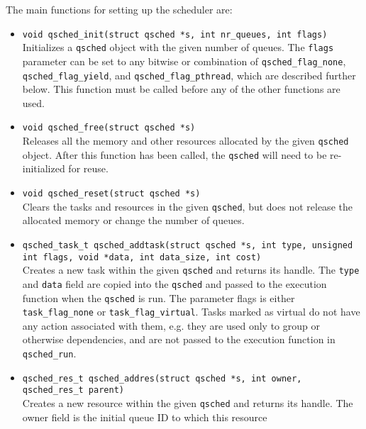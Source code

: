 \documentclass[preprint]{elsarticle}
\begin{document}
The main functions for setting up the scheduler are:
\begin{itemize}
    \item {\tt void qsched\_init(struct qsched *s, int nr\_queues, int flags)} \\
        Initializes a {\tt qsched} object with the given number of queues.
        The {\tt flags} parameter can be set to any bitwise or combination
        of {\tt qsched\_flag\_none},
        {\tt qsched\_flag\_yield}, and {\tt qsched\_flag\_pthread},
        which are described further below.
        This function must be called before any of the other
        functions are used.
        \vspace{1mm}
    \item {\tt void qsched\_free(struct qsched *s)} \\
        Releases all the memory and other resources allocated by the
        given {\tt qsched} object.
        After this function has been called, the {\tt qsched} will
        need to be re-initialized for reuse.
        \vspace{1mm}
    \item {\tt void qsched\_reset(struct qsched *s)} \\
        Clears the tasks and resources in the given {\tt qsched},
        but does not release the allocated memory or change
        the number of queues.
        \vspace{1mm}
    \item {\tt qsched\_task\_t qsched\_addtask(struct qsched *s, int type, unsigned int flags, void *data, int data\_size, int cost)} \\
        Creates a new task within the given {\tt qsched} and returns
        its handle.
        The {\tt type} and {\tt data} field are copied into the {\tt qsched}
        and passed to the execution function when the {\tt qsched} is run.
        The parameter flags is either {\tt task\_flag\_none} or
        {\tt task\_flag\_virtual}.
        Tasks marked as virtual do not have any action associated with them,
        e.g. they are used only to group or otherwise dependencies, and
        are not passed to the execution function in {\tt qsched\_run}.
        \vspace{1mm}
    \item {\tt qsched\_res\_t qsched\_addres(struct qsched *s, int owner, qsched\_res\_t parent)} \\
        Creates a new resource within the given {\tt qsched} and returns
        its handle.
        The owner field is the initial queue ID to which this resource

\end{itemize}
\end{document}
